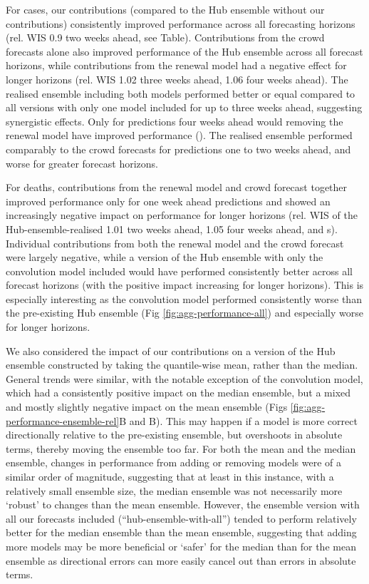\documentclass[10pt,letterpaper]{article}
\begin{document}
For cases, our contributions (compared to the Hub ensemble without our
contributions) consistently improved performance across all forecasting
horizons (rel. WIS 0.9 two weeks ahead, see
 Table). Contributions from the
crowd forecasts alone also improved performance of the Hub ensemble
across all forecast horizons, while contributions from the renewal model
had a negative effect for longer horizons (rel. WIS 1.02 three weeks
ahead, 1.06 four weeks ahead). The realised ensemble including both
models performed better or equal compared to all versions with only one
model included for up to three weeks ahead, suggesting synergistic
effects. Only for predictions four weeks ahead would removing the
renewal model have improved performance
(). The realised ensemble performed
comparably to the crowd forecasts for predictions one to two weeks
ahead, and worse for greater forecast horizons.

For deaths, contributions from the renewal model and crowd forecast
together improved performance only for one week ahead predictions and
showed an increasingly negative impact on performance for longer
horizons (rel. WIS of the Hub-ensemble-realised 1.01 two weeks ahead,
1.05 four weeks ahead,  and
s). Individual contributions from
both the renewal model and the crowd forecast were largely negative,
while a version of the Hub ensemble with only the convolution model
included would have performed consistently better across all forecast
horizons (with the positive impact increasing for longer horizons). This
is especially interesting as the convolution model performed
consistently worse than the pre-existing Hub ensemble (Fig
\ref{fig:agg-performance-all}) and especially worse for longer horizons.

We also considered the impact of our contributions on a version of the
Hub ensemble constructed by taking the quantile-wise mean, rather than
the median. General trends were similar, with the notable exception of
the convolution model, which had a consistently positive impact on the
median ensemble, but a mixed and mostly slightly negative impact on the
mean ensemble (Figs \ref{fig:agg-performance-ensemble-rel}B and
B). This may happen if a
model is more correct directionally relative to the pre-existing
ensemble, but overshoots in absolute terms, thereby moving the ensemble
too far. For both the mean and the median ensemble, changes in
performance from adding or removing models were of a similar order of
magnitude, suggesting that at least in this instance, with a relatively
small ensemble size, the median ensemble was not necessarily more
`robust' to changes than the mean ensemble. However, the ensemble
version with all our forecasts included (``hub-ensemble-with-all'')
tended to perform relatively better for the median ensemble than the
mean ensemble, suggesting that adding more models may be more beneficial
or `safer' for the median than for the mean ensemble as directional
errors can more easily cancel out than errors in absolute terms.
\end{document}
